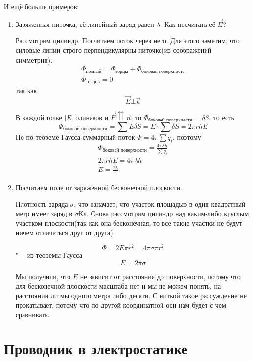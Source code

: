 И ещё больше примеров:
\begin{enumerate}
\item
	Заряженная ниточка, её линейный заряд равен $\lambda$. Как посчитать её $\vec{E}$?

	Рассмотрим цилиндр. Посчитаем поток через него. Для этого заметим, что силовые линии строго перпендикулярны ниточке(из соображений
	симметрии).
	\begin{gather*}
		\Phi_{\text{полный}} = \Phi_{\text{торцы}} + \Phi_{\text{боковая поверхность}} \\
		\Phi_{\text{торцов}} = 0
	\end{gather*}
	так как
	\[\vec{E} \bot \vec{n}\]

	В каждой точке $|E|$ одинаков и $\vec{E} \upuparrows \vec{n}$, то $\Phi_{\text{боковой поверхности}} = \delta S$, то есть
	\[\Phi_{\text{боковой поверхности}} = \sum E \delta S = E \cdot \sum \delta S = 2 \pi r h E\]
	Но по теореме Гаусса суммарный поток $\Phi = 4\pi\sum q_i$, поэтому
	\begin{gather*}
		\Phi_{\text{боковой поверхности}} = \frac{4\pi\lambda h}{\sum q_i} \\
		2\pi r h E = 4 \pi \lambda h \\
		E = \frac{2 \lambda}{r}
	\end{gather*}

\item
	Посчитаем поле от заряженной бесконечной плоскости.

	Плотность заряда $\sigma$, что означает, что участок площадью в один квадратный метр имеет заряд в $\sigma \text{Кл}$.
	Снова рассмотрим цилиндр над каким-либо круглым участком плоскости(так как она бесконечная, то все такие участки не будут
	ничем отличаться друг от друга).

	\[\Phi = 2E\pi r^2 = 4\pi\sigma\pi r^2\] "--- из теоремы Гаусса
	\[E = 2\pi\sigma\]

	Мы получили, что $E$ не зависит от расстояния до поверхности, потому что для бесконечной плоскости масштаба нет
	и мы не можем понять, на расстоянии ли мы одного метра либо десяти. С ниткой такое рассуждение не прокатывает, потому что по другой
	координатной оси нам будет с чем сравнивать.

\end{enumerate}

\section{Проводник в электростатике}

